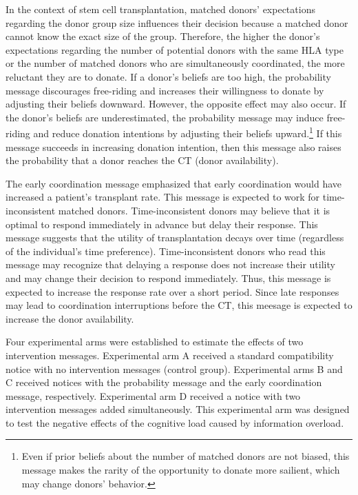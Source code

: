 \documentclass[12pt, a4paper]{article}
\begin{document}
In the context of stem cell transplantation, matched donors' expectations regarding the donor group size influences their decision because a matched donor cannot know the exact size of the group. Therefore, the higher the donor's expectations regarding the number of potential donors with the same HLA type or the number of matched donors who are simultaneously coordinated, the more reluctant they are to donate. If a donor's beliefs are too high, the probability message discourages free-riding and increases their willingness to donate by adjusting their beliefs downward. However, the opposite effect may also occur. If the donor's beliefs are underestimated, the probability message may induce free-riding and reduce donation intentions by adjusting their beliefs upward.\footnote{Even if prior beliefs about the number of matched donors are not biased, this message makes the rarity of the opportunity to donate more sailient, which may change donors' behavior.} If this message succeeds in increasing donation intention, then this message also raises the probability that a donor reaches the CT (donor availability).

The early coordination message emphasized that early coordination would have increased a patient's transplant rate. This message is expected to work for time-inconsistent matched donors. Time-inconsistent donors may believe that it is optimal to respond immediately in advance but delay their response. This message suggests that the utility of transplantation decays over time (regardless of the individual's time preference). Time-inconsistent donors who read this message may recognize that delaying a response does not increase their utility and may change their decision to respond immediately. Thus, this message is expected to increase the response rate over a short period. Since late responses may lead to coordination interruptions before the CT, this meesage is expected to increase the donor availability.

Four experimental arms were established to estimate the effects of two intervention messages. Experimental arm A received a standard compatibility notice with no intervention messages (control group). Experimental arms B and C received notices with the probability message and the early coordination message, respectively. Experimental arm D received a notice with two intervention messages added simultaneously. This experimental arm was designed to test the negative effects of the cognitive load caused by information overload.
\end{document}
